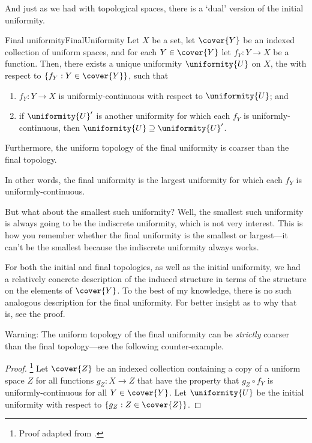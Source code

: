 And just as we had with topological spaces, there is a `dual' version of the initial uniformity.
\begin{prp}{Final uniformity}{FinalUniformity}
Let $X$ be a set, let $\cover{Y}$ be an indexed collection of uniform spaces, and for each $Y\in \cover{Y}$ let $f_Y:Y\rightarrow X$ be a function.  Then, there exists a unique uniformity $\uniformity{U}$ on $X$, the  with respect to $\{ f_Y:Y\in \cover{Y}\}$, such that
\begin{enumerate}
\item $f_Y:Y\rightarrow X$ is uniformly-continuous with respect to $\uniformity{U}$; and
\item if $\uniformity{U}'$ is another uniformity for which each $f_Y$ is uniformly-continuous, then $\uniformity{U}\supseteq \uniformity{U}'$.
\end{enumerate}
Furthermore, the uniform topology of the final uniformity is coarser than the final topology.
\begin{rmk}
In other words, the final uniformity is the largest uniformity for which each $f_Y$ is uniformly-continuous.
\end{rmk}
\begin{rmk}
But what about the smallest such uniformity?  Well, the smallest such uniformity is always going to be the indiscrete uniformity, which is not very interest.  This is how you remember whether the final uniformity is the smallest or largest---it can't be the smallest because the indiscrete uniformity always works.
\end{rmk}
\begin{rmk}
For both the initial and final topologies, as well as the initial uniformity, we had a relatively concrete description of the induced structure in terms of the structure on the elements of $\cover{Y}$.  To the best of my knowledge, there is no such analogous description for the final uniformity.  For better insight as to why that is, see the proof.
\end{rmk}
\begin{wrn}
Warning:  The uniform topology of the final uniformity can be \emph{strictly} coarser than the final topology---see the following counter-example.
\end{wrn}
\begin{proof}\footnote{Proof adapted from \cite[Theorem 1.2.1.1]{Preuss}.}
Let $\cover{Z}$ be an indexed collection containing a copy of a uniform space $Z$ for all functions $g_Z\colon X\rightarrow Z$ that have the property that $g_Z\circ f_Y$ is uniformly-continuous for all $Y\in \cover{Y}$.  Let $\uniformity{U}$ be the initial uniformity with respect to $\{ g_Z:Z\in \cover{Z}\}$.


\end{proof}
\end{prp}
